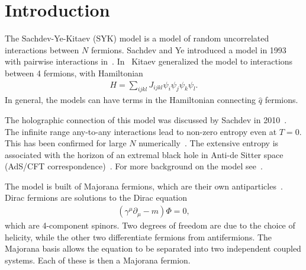 \documentclass[12pt]{article} %
\begin{document}
\section{Introduction} \label{sec:intro}

The Sachdev-Ye-Kitaev (SYK) model is a model of random uncorrelated interactions between $N$ fermions. Sachdev and Ye introduced a model in 1993 with pairwise interactions in~\cite{sachdev93}. In~\cite{kitaev15} Kitaev generalized the model to interactions between 4 fermions, with Hamiltonian
\begin{align}
H = \sum_{ijkl}J_{ijkl}\psi_i\psi_j\psi_k\psi_l.
\end{align} 
In general, the models can have terms in the Hamiltonian connecting $\hat{q}$ fermions. 

The holographic connection of this model was discussed by Sachdev in 2010~\cite{sachdev10}. The infinite range any-to-any interactions lead to non-zero entropy even at $T=0$. This has been confirmed for large $N$ numerically~\cite{Georges2001}. The extensive entropy is associated with the horizon of an extremal black hole in Anti-de Sitter space (AdS/CFT correspondence)~\cite{fu16}. For more background on the model see~\cite{mald16}.

The model is built of Majorana fermions, which are their own antiparticles~\cite{elliott14}. Dirac fermions are solutions to the Dirac equation
\begin{align}
(\gamma^\mu\partial_\mu - m)\Phi = 0,
\end{align}
which are 4-component spinors. Two degrees of freedom are due to the choice of helicity, while the other two differentiate fermions from antifermions. The Majorana basis allows the equation to be separated into two independent coupled systems. Each of these is then a Majorana fermion. 
\end{document}
